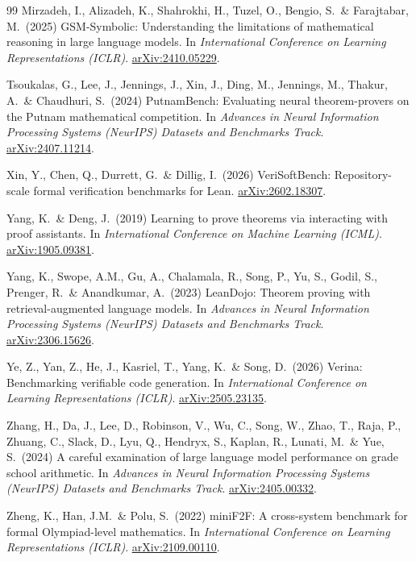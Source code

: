 \documentclass{article}
\newcommand{\arxiv}[1]{\href{https://arxiv.org/abs/#1}{arXiv:#1}}
\begin{document}
{\begin{thebibliography}{99}
Mirzadeh, I., Alizadeh, K., Shahrokhi, H., Tuzel, O., Bengio, S.\ \& Farajtabar, M.\ (2025)
GSM-Symbolic: Understanding the limitations of mathematical reasoning in large language models.
In {\it International Conference on Learning Representations (ICLR)}.
\arxiv{2410.05229}.

Tsoukalas, G., Lee, J., Jennings, J., Xin, J., Ding, M., Jennings, M., Thakur, A.\ \& Chaudhuri,
S.\ (2024) PutnamBench: Evaluating neural theorem-provers on the Putnam mathematical competition.
In {\it Advances in Neural Information Processing Systems (NeurIPS) Datasets and Benchmarks
Track}. \arxiv{2407.11214}.

Xin, Y., Chen, Q., Durrett, G.\ \& Dillig, I.\ (2026) VeriSoftBench: Repository-scale formal
verification benchmarks for Lean. \arxiv{2602.18307}.

Yang, K.\ \& Deng, J.\ (2019) Learning to prove theorems via interacting with proof assistants.
In {\it International Conference on Machine Learning (ICML)}.
\arxiv{1905.09381}.

Yang, K., Swope, A.M., Gu, A., Chalamala, R., Song, P., Yu, S., Godil, S., Prenger, R.\ \&
Anandkumar, A.\ (2023) LeanDojo: Theorem proving with retrieval-augmented language models. In
{\it Advances in Neural Information Processing Systems (NeurIPS) Datasets and Benchmarks Track}.
\arxiv{2306.15626}.

Ye, Z., Yan, Z., He, J., Kasriel, T., Yang, K.\ \& Song, D.\ (2026) Verina: Benchmarking
verifiable code generation. In {\it International Conference on Learning Representations (ICLR)}.
\arxiv{2505.23135}.

Zhang, H., Da, J., Lee, D., Robinson, V., Wu, C., Song, W., Zhao, T., Raja, P., Zhuang, C.,
Slack, D., Lyu, Q., Hendryx, S., Kaplan, R., Lunati, M.\ \& Yue, S.\ (2024) A careful
examination of large language model performance on grade school arithmetic. In {\it Advances in
Neural Information Processing Systems (NeurIPS) Datasets and Benchmarks Track}.
\arxiv{2405.00332}.

Zheng, K., Han, J.M.\ \& Polu, S.\ (2022) miniF2F: A cross-system benchmark for formal
Olympiad-level mathematics. In {\it International Conference on Learning Representations (ICLR)}.
\arxiv{2109.00110}.

\end{thebibliography}
}
\end{document}
